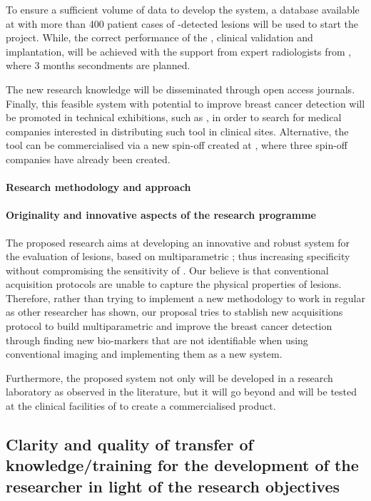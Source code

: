 To ensure a sufficient volume of data to develop the \cad system, a database available at \florida with more than 400 patient cases of \mri-detected \nmle lesions will be used to start the project. While, the correct performance of the \cad, clinical validation and implantation, will be achieved with the support from expert radiologists from \udiat, where 3 months secondments are planned.

The new research knowledge will be disseminated through open access journals. Finally, this feasible \cad system with potential to improve breast cancer detection will be promoted in technical exhibitions, such as \ecr, in order to search for medical companies interested in distributing such tool in clinical sites. Alternative, the tool can be commercialised via a new spin-off created at \vicorob, where three spin-off companies have already been created.

\paragraph{Research methodology and approach}
\paragraph{Originality and innovative aspects of the research programme}

The proposed research aims at developing an innovative and robust \cad system for the evaluation of \nmle lesions, based on multiparametric \mri; thus increasing specificity without compromising the sensitivity of \cemri.
Our believe is that conventional \mri acquisition protocols are unable to capture the physical properties of \nmle lesions.
Therefore, rather than trying to implement a new \cad methodology to work in regular \mri as other researcher has shown,
our proposal tries to stablish new \mri acquisitions protocol to build multiparametric \mri and improve the breast cancer detection through finding new bio-markers that are not identifiable when using conventional imaging and implementing them as a new \cad system.

Furthermore, the proposed \cad system not only will be developed in a research laboratory as observed in the literature, but it will go beyond and will be tested at the clinical facilities of \udiat to create a commercialised product. 

\subsection{Clarity and quality of transfer of knowledge/training for the development of the researcher in light of the research objectives}
\label{sec:transfer}

